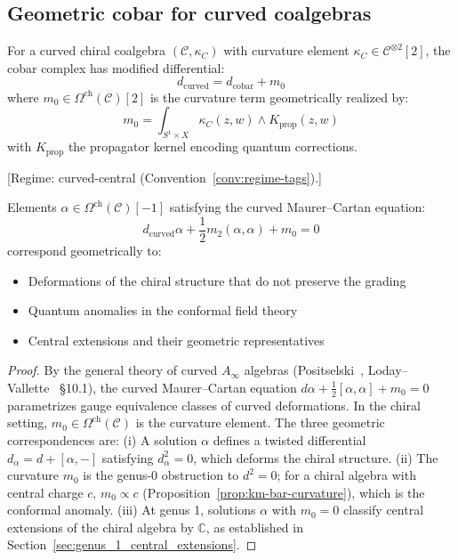 \subsection{Geometric cobar for curved coalgebras}

\begin{definition}\label{def:curved-cobar}
For a curved chiral coalgebra $(\mathcal{C}, \kappa_C)$ with curvature element $\kappa_C \in \mathcal{C}^{\otimes 2}[2]$, the cobar complex has modified differential:
\[
d_{\text{curved}} = d_{\text{cobar}} + m_0
\]
where $m_0 \in \Omega^{\text{ch}}(\mathcal{C})[2]$ is the curvature term geometrically realized by:
\[
m_0 = \int_{S^1 \times X} \kappa_C(z, w) \wedge K_{\text{prop}}(z, w)
\]
with $K_{\text{prop}}$ the propagator kernel encoding quantum corrections.
\end{definition}

\begin{theorem}\label{thm:curved-mc-cobar}
\textup{[Regime: curved-central
\textup{(}Convention~\textup{\ref{conv:regime-tags})}.]}

Elements $\alpha \in \Omega^{\text{ch}}(\mathcal{C})[-1]$ satisfying the curved Maurer--Cartan equation:
\[
d_{\text{curved}}\alpha + \frac{1}{2}m_2(\alpha, \alpha) + m_0 = 0
\]
correspond geometrically to:
\begin{itemize}
\item Deformations of the chiral structure that do not preserve the grading
\item Quantum anomalies in the conformal field theory
\item Central extensions and their geometric representatives
\end{itemize}
\end{theorem}

\begin{proof}
By the general theory of curved $A_\infty$ algebras (Positselski~\cite{Positselski11}, Loday--Vallette~\cite{LV12} \S10.1), the curved Maurer--Cartan equation $d\alpha + \frac{1}{2}[\alpha,\alpha] + m_0 = 0$ parametrizes gauge equivalence classes of curved deformations.  In the chiral setting, $m_0 \in \Omega^{\mathrm{ch}}(\mathcal{C})$ is the curvature element.  The three geometric correspondences are:
(i) A solution $\alpha$ defines a twisted differential $d_\alpha = d + [\alpha, -]$ satisfying $d_\alpha^2 = 0$, which deforms the chiral structure.
(ii) The curvature $m_0$ is the genus-0 obstruction to $d^2 = 0$; for a chiral algebra with central charge $c$, $m_0 \propto c$ (Proposition~\ref{prop:km-bar-curvature}), which is the conformal anomaly.
(iii) At genus 1, solutions $\alpha$ with $m_0 = 0$ classify central extensions of the chiral algebra by $\mathbb{C}$, as established in Section~\ref{sec:genus_1_central_extensions}.
\end{proof}

